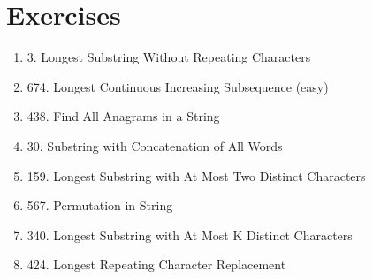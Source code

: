 \documentclass[../main.tex]{subfiles}
\begin{document}
\section{Exercises}
\begin{enumerate}
\item 3. Longest Substring Without Repeating Characters
\item 674. Longest Continuous Increasing Subsequence (easy)
\item 438. Find All Anagrams in a String
\item 30. Substring with Concatenation of All Words
\item 159. Longest Substring with At Most Two Distinct Characters
\item 567. Permutation in String
\item 340. Longest Substring with At Most K Distinct Characters
\item 424. Longest Repeating Character Replacement
\end{enumerate}

% 






 
\end{document}
